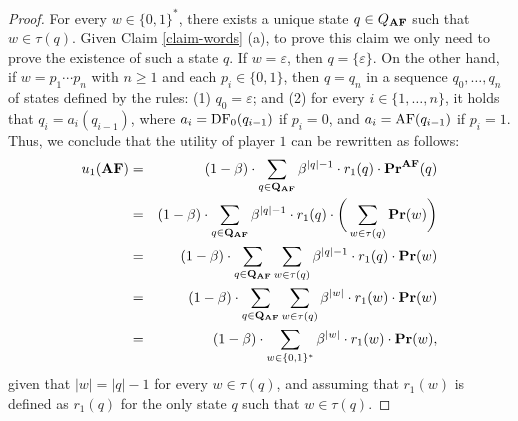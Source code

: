 \begin{proof}
For every $w \in \{0,1\}^*$, there exists a unique state $q \in Q_{\text{\rm {\bf AF}}}$ such that $w \in \tau(q)$. Given Claim \ref{claim-words} (a), to prove this claim we only need to prove the existence of such a state $q$. If $w = \varepsilon$, then $q = \{\varepsilon\}$. On the other hand, if $w = p_1 \cdots p_n$ with $n \geq 1$ and each $p_i \in \{0,1\}$, then $q = q_n$ in a sequence $q_0, \ldots, q_n$ of states defined by the rules: (1) $q_0 = \varepsilon$; and (2) for every $i \in \{1, \ldots, n\}$, it holds that $q_{i} = a_{i}(q_{i-1})$, where $a_{i} = \text{\rm DF}_0(q_{i-1})$ if $p_i = 0$, and $a_{i} = \text{\rm AF}(q_{i-1})$ if $p_i = 1$.
Thus, we conclude that the utility of player $1$ can be rewritten as follows:
\begin{eqnarray*}
u_1(\text{\rm {\bf AF}}) & = & (1-\beta) \cdot  \sum_{q \in \mathbf{Q}_{\text{\rm {\bf AF}}}} \beta^{|q|-1} \cdot  r_1(q) \cdot \mathbf{Pr}^{\text{\rm {\bf AF}}}(q)\\
& = & (1-\beta) \cdot \sum_{q \in \mathbf{Q}_{\text{\rm {\bf AF}}}} \beta^{|q|-1} \cdot  r_1(q) \cdot \bigg(\sum_{w \in \tau(q)} \mathbf{Pr}(w)\bigg)\\
& = &  (1-\beta) \cdot \sum_{q \in \mathbf{Q}_{\text{\rm {\bf AF}}}} \sum_{w \in \tau(q)} \beta^{|q|-1} \cdot  r_1(q) \cdot \mathbf{Pr}(w)\\
& = &  (1-\beta) \cdot \sum_{q \in \mathbf{Q}_{\text{\rm {\bf AF}}}} \sum_{w \in \tau(q)} \beta^{|w|} \cdot  r_1(w) \cdot \mathbf{Pr}(w)\\
& = & (1-\beta) \cdot \sum_{w \in \{0,1\}^*} \beta^{|w|} \cdot  r_1(w) \cdot \mathbf{Pr}(w),
\end{eqnarray*}
given that $|w| = |q| -1$ for every $w \in \tau(q)$, and assuming that $r_1(w)$ is defined as $r_1(q)$ for the only state $q$ such that $w \in \tau(q)$.







\end{proof}
